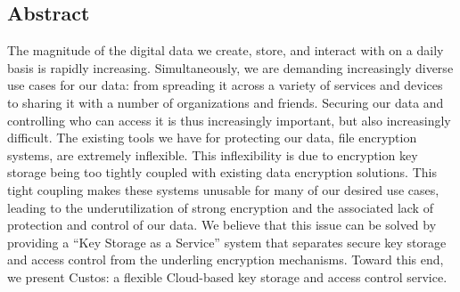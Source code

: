\subsection*{Abstract}

The magnitude of the digital data we create, store, and interact with
on a daily basis is rapidly increasing. Simultaneously, we are
demanding increasingly diverse use cases for our data: from spreading
it across a variety of services and devices to sharing it with a
number of organizations and friends. Securing our data and controlling
who can access it is thus increasingly important, but also
increasingly difficult. The existing tools we have for protecting our
data, file encryption systems, are extremely inflexible. This
inflexibility is due to encryption key storage being too tightly
coupled with existing data encryption solutions. This tight coupling
makes these systems unusable for many of our desired use cases,
leading to the underutilization of strong encryption and the
associated lack of protection and control of our data. We believe that
this issue can be solved by providing a ``Key Storage as a Service''
system that separates secure key storage and access control from the
underling encryption mechanisms. Toward this end, we present Custos: a
flexible Cloud-based key storage and access control service.
